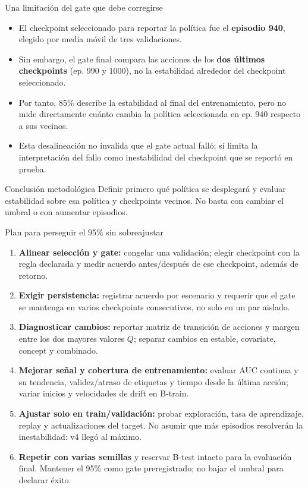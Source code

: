 \documentclass[aspectratio=169,10pt]{beamer}
\begin{document}
\begin{frame}{Una limitación del gate que debe corregirse}
\begin{itemize}
  \item El checkpoint seleccionado para reportar la política fue el
        \textbf{episodio 940}, elegido por media móvil de tres validaciones.
  \item Sin embargo, el gate final compara las acciones de los
        \textbf{dos últimos checkpoints} (ep. 990 y 1000), no la estabilidad
        alrededor del checkpoint seleccionado.
  \item Por tanto, 85\% describe la estabilidad al final del entrenamiento,
        pero no mide directamente cuánto cambia la política seleccionada en
        ep. 940 respecto a sus vecinos.
  \item Esta desalineación no invalida que el gate actual falló; sí limita la
        interpretación del fallo como inestabilidad del checkpoint que se
        reportó en prueba.
\end{itemize}
\vspace{0.4em}
\begin{block}{Conclusión metodológica}
Definir primero qué política se desplegará y evaluar estabilidad sobre esa
política y checkpoints vecinos. No basta con cambiar el umbral o con aumentar
episodios.
\end{block}
\end{frame}

\begin{frame}{Plan para perseguir el 95\% sin sobreajustar}
\begin{enumerate}
  \item \textbf{Alinear selección y gate:} congelar una validación; elegir
        checkpoint con la regla declarada y medir acuerdo antes/después de ese
        checkpoint, además de retorno.
  \item \textbf{Exigir persistencia:} registrar acuerdo por escenario y
        requerir que el gate se mantenga en varios checkpoints consecutivos,
        no solo en un par aislado.
  \item \textbf{Diagnosticar cambios:} reportar matriz de transición de
        acciones y margen entre los dos mayores valores \(Q\); separar cambios
        en estable, covariate, concept y combinado.
  \item \textbf{Mejorar señal y cobertura de entrenamiento:} evaluar AUC
        continua y su tendencia, validez/atraso de etiquetas y tiempo desde la
        última acción; variar inicios y velocidades de drift en B-train.
  \item \textbf{Ajustar solo en train/validación:} probar exploración,
        tasa de aprendizaje, replay y actualizaciones del target. No asumir
        que más episodios resolverán la inestabilidad: v4 llegó al máximo.
  \item \textbf{Repetir con varias semillas} y reservar B-test intacto para la
        evaluación final. Mantener el 95\% como gate preregistrado; no bajar
        el umbral para declarar éxito.
\end{enumerate}
\end{frame}
\end{document}
